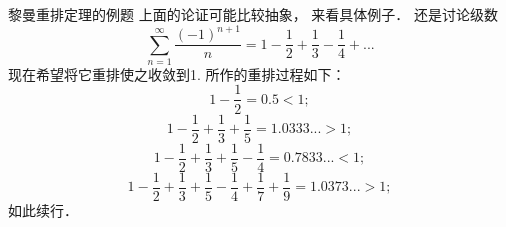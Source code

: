 \begin{example}{黎曼重排定理的例题}
上面的论证可能比较抽象， 来看具体例子． 还是讨论级数
$$
\sum_{n=1}^\infty\frac{(-1)^{n+1}}{n}
=1-\frac{1}{2}+\frac{1}{3}-\frac{1}{4}+...
$$
现在希望将它重排使之收敛到1. 所作的重排过程如下：
$$
1-\frac{1}{2}=0.5<1;
$$ 
$$
1-\frac{1}{2}+\frac{1}{3}+\frac{1}{5}=1.0333...>1;
$$ 
$$
1-\frac{1}{2}+\frac{1}{3}+\frac{1}{5}-\frac{1}{4}=0.7833...<1;
$$ 
$$
1-\frac{1}{2}+\frac{1}{3}+\frac{1}{5}-\frac{1}{4}+\frac{1}{7}+\frac{1}{9}=1.0373...>1;
$$
如此续行．
\end{example}